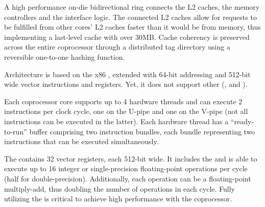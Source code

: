 \documentclass[../thesis]{subfiles}
\begin{document}
	A high performance on-die bidirectional ring connects the L2 caches, the memory controllers and the \pcie interface logic. The connected L2 caches allow for requests to be fulfilled from other cores' L2 caches faster than it would be from memory, thus implementing a last-level cache with over 30MB. Cache coherency is preserved across the entire coprocessor through a distributed tag directory using a reversible one-to-one hashing function.

	\intel\mic Architecture is based on the x86 \isa, extended with 64-bit addressing and 512-bit wide \simd vector instructions and registers. Yet, it does not support other \simd\isas (\mmx, \intel\sse and \intel\avx).

	Each coprocessor core supports up to 4 hardware threads and can execute 2 instructions per clock cycle, one on the U-pipe and one on the V-pipe (not all instructions can be executed in the latter). Each hardware thread has a ``ready-to-run'' buffer comprising two instruction bundles, each bundle representing two instructions that can be executed simultaneously.

	The \vpu contains 32 vector registers, each 512-bit wide. It includes the \emu and is able to execute up to 16 integer or single-precision floating-point operations per cycle (half for double-precision). Additionally, each operation can be a floating-point multiply-add, thus doubling the number of operations in each cycle. Fully utilizing the \vpu is critical to achieve high performance with the coprocessor.
\end{document}
